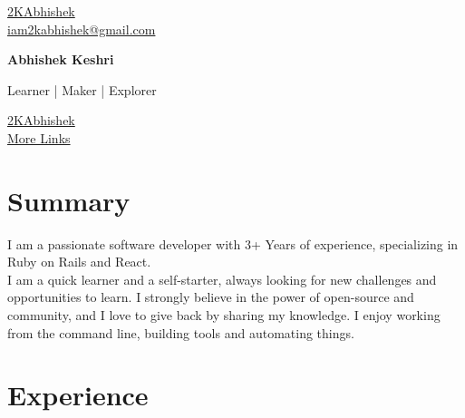 \documentclass[11pt]{article} %
\begin{document}
\begin{multicols}{3}
  \begin{flushleft}
    \color{gray}{\faGithub} \href{https://github.com/2kabhishek}{2KAbhishek} \\
    \color{gray}{\faEnvelope} \href{mailto:iam2kabhishek@gmail.com}{iam2kabhishek@gmail.com} \\
  \end{flushleft}

\columnbreak

  \begin{center}
      {\huge\bfseries Abhishek Keshri} \par
      Learner | Maker | Explorer \par
  \end{center}

\columnbreak

  \begin{flushright}
    \href{https://linkedin.com/in/2kabhishek/}{2KAbhishek} {\color{gray}{\faLinkedin}} \\
    \href{https://2kabhishek.github.io/links}{More Links} {\textcolor{gray}{\faLink}} \\
  \end{flushright}
\end{multicols}

\section{Summary}
I am a passionate software developer with 3+ Years of experience, specializing in Ruby on Rails and React. \\
I am a quick learner and a self-starter, always looking for new challenges and opportunities to learn.
I strongly believe in the power of open-source and community, and I love to give back by sharing my knowledge.
I enjoy working from the command line, building tools and automating things.

\section{Experience}
\end{document}
